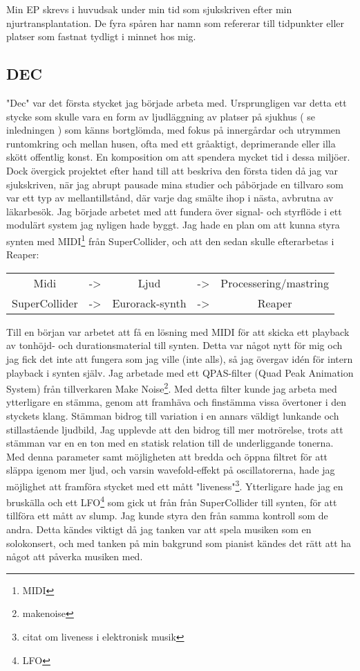 \documentclass{article}
\begin{document}
  Min EP skrevs i huvudsak under min tid som sjukskriven efter min njurtransplantation. De fyra spåren har
  namn som refererar till tidpunkter eller platser som fastnat tydligt i minnet hos mig. 
	\subsection{DEC}
	"Dec" var det första stycket jag började arbeta med. Ursprungligen var detta ett stycke som skulle vara en
	form av ljudläggning av platser på sjukhus ( se inledningen ) som känns bortglömda, med fokus på
	innergårdar och utrymmen runtomkring och mellan husen, ofta med ett gråaktigt, deprimerande eller illa
	skött offentlig konst. En komposition om att spendera mycket tid i dessa miljöer. Dock övergick projektet
	efter hand till att beskriva den första tiden då jag var sjukskriven, när jag abrupt pausade mina studier
	och påbörjade en tillvaro som var ett typ av mellantillstånd, där varje dag smälte ihop i nästa, avbrutna
	av läkarbesök. 
		Jag började arbetet med att fundera över signal- och styrflöde i ett modulärt system jag nyligen hade
		byggt. Jag hade en plan om att kunna styra synten med MIDI\footnote{MIDI} från SuperCollider, och att
		den sedan skulle efterarbetas i Reaper:
		\begin{center}
			\begin{tabular}{ c c c c c }
				Midi		  & -> & Ljud			& -> & Processering/mastring \\
				SuperCollider & -> & Eurorack-synth & -> & Reaper
			\end{tabular}
		\end{center}

		Till en början var arbetet att få en lösning med MIDI för att skicka ett playback av tonhöjd- och
		durationsmaterial till synten. Detta var något nytt för mig och jag fick det inte att fungera som jag
		ville (inte alls), så jag övergav idén för intern playback i synten själv. 
		Jag arbetade med ett QPAS-filter (Quad Peak Animation System) från tillverkaren Make
		Noise\footnote{makenoise}. Med detta filter kunde jag arbeta med ytterligare en stämma, genom att
		framhäva och finstämma vissa övertoner i den styckets klang. Stämman bidrog till variation i en
		annars väldigt lunkande och stillastående ljudbild, Jag upplevde att den bidrog till mer motrörelse,
		trots att stämman var en en ton med en statisk relation till de underliggande tonerna. Med denna
		parameter samt möjligheten att bredda och öppna filtret för att släppa igenom mer ljud, och varsin
		wavefold-effekt på oscillatorerna, hade jag möjlighet att framföra stycket med ett mått
		"liveness"\footnote{citat om liveness i elektronisk musik}. Ytterligare hade jag en bruskälla och ett
		LFO\footnote{LFO} som gick ut från från SuperCollider till synten, för att tillföra ett mått av slump.
		Jag kunde styra den från samma kontroll som de andra. Detta kändes viktigt då jag tanken var att
		spela musiken som en solokonsert, och med tanken på min bakgrund som pianist kändes det rätt att ha
		något att påverka musiken med. 
\end{document}
